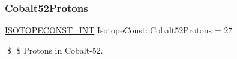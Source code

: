 \subsubsection{\texorpdfstring{Cobalt52\+Protons}{Cobalt52Protons}}
{\footnotesize\ttfamily \mbox{\hyperlink{group___isotope_const-_macros_ga5f18360b3e99483a35c32d789e62621c}{I\+S\+O\+T\+O\+P\+E\+C\+O\+N\+S\+T\+\_\+\+I\+NT}} Isotope\+Const\+::\+Cobalt52\+Protons = 27}

\$ \$ Protons in Cobalt-\/52. 